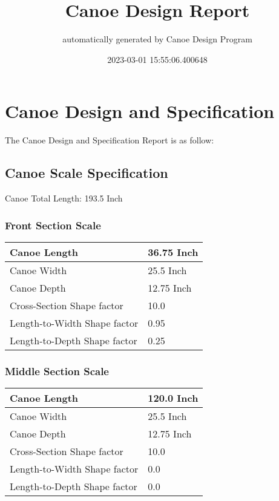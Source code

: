\documentclass{article}%
\title{Canoe Design Report}%
\author{automatically generated by Canoe Design Program}%
\date{2023{-}03{-}01 15:55:06.400648}%
\begin{document}
%
\normalsize%
\selectfont%
\fontsize{12}{15}%
\pagestyle{fancy}%
\maketitle%
\thispagestyle{fancy}%
\section{Canoe Design and Specification}%
\label{sec:CanoeDesignandSpecification}%
The Canoe Design and Specification Report is as follow: %
\subsection{Canoe Scale Specification}%
\label{subsec:CanoeScaleSpecification}%
Canoe Total Length: 193.5 Inch%
\subsubsection{Front Section Scale}%
\label{ssubsec:FrontSectionScale}%
\renewcommand{\arraystretch}{1.5}%
\begin{tabular}{|l|l|}%
\hline%
Canoe Length&36.75 Inch\\%
\hline%
Canoe Width&25.5 Inch\\%
\hline%
Canoe Depth&12.75 Inch\\%
\hline%
Cross{-}Section Shape factor&10.0\\%
\hline%
Length{-}to{-}Width Shape factor&0.95\\%
\hline%
Length{-}to{-}Depth Shape factor&0.25\\%
\hline%
\end{tabular}

%
\subsubsection{Middle Section Scale}%
\label{ssubsec:MiddleSectionScale}%
\renewcommand{\arraystretch}{1.5}%
\begin{tabular}{|l|l|}%
\hline%
Canoe Length&120.0 Inch\\%
\hline%
Canoe Width&25.5 Inch\\%
\hline%
Canoe Depth&12.75 Inch\\%
\hline%
Cross{-}Section Shape factor&10.0\\%
\hline%
Length{-}to{-}Width Shape factor&0.0\\%
\hline%
Length{-}to{-}Depth Shape factor&0.0\\%
\hline%
\end{tabular}
\end{document}

